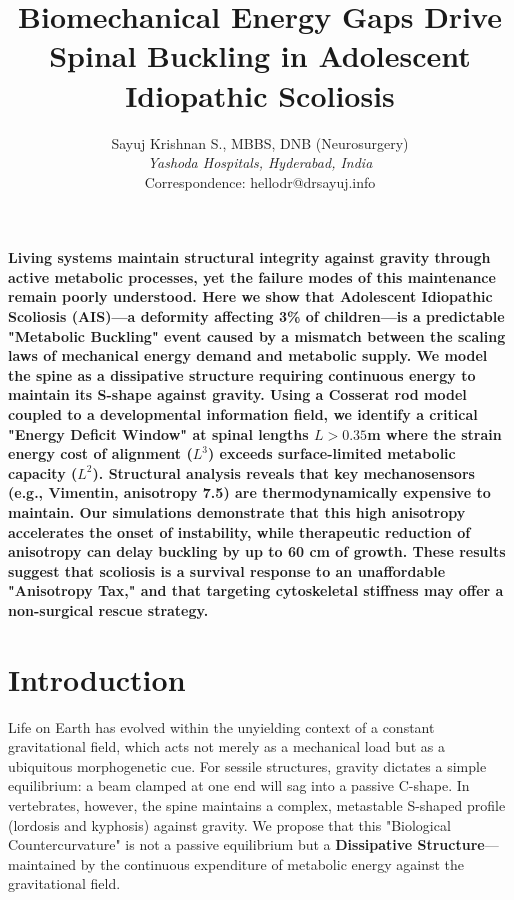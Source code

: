 \documentclass[11pt]{article}
\title{Biomechanical Energy Gaps Drive Spinal Buckling in Adolescent Idiopathic Scoliosis}
\author{Sayuj Krishnan S., MBBS, DNB (Neurosurgery) \\
\textit{Yashoda Hospitals, Hyderabad, India} \\
Correspondence: hellodr@drsayuj.info}
\date{}
\begin{document}
\maketitle

\textbf{Living systems maintain structural integrity against gravity through active metabolic processes, yet the failure modes of this maintenance remain poorly understood. Here we show that Adolescent Idiopathic Scoliosis (AIS)—a deformity affecting 3\% of children—is a predictable "Metabolic Buckling" event caused by a mismatch between the scaling laws of mechanical energy demand and metabolic supply. We model the spine as a dissipative structure requiring continuous energy to maintain its S-shape against gravity. Using a Cosserat rod model coupled to a developmental information field, we identify a critical "Energy Deficit Window" at spinal lengths $L > 0.35$m where the strain energy cost of alignment ($L^3$) exceeds surface-limited metabolic capacity ($L^2$). Structural analysis reveals that key mechanosensors (e.g., Vimentin, anisotropy 7.5) are thermodynamically expensive to maintain. Our simulations demonstrate that this high anisotropy accelerates the onset of instability, while therapeutic reduction of anisotropy can delay buckling by up to 60 cm of growth. These results suggest that scoliosis is a survival response to an unaffordable "Anisotropy Tax," and that targeting cytoskeletal stiffness may offer a non-surgical rescue strategy.}

\section*{Introduction}

Life on Earth has evolved within the unyielding context of a constant gravitational field, which acts not merely as a mechanical load but as a ubiquitous morphogenetic cue\cite{thompson1917growth}. For sessile structures, gravity dictates a simple equilibrium: a beam clamped at one end will sag into a passive C-shape. In vertebrates, however, the spine maintains a complex, metastable S-shaped profile (lordosis and kyphosis) against gravity\cite{latimer2005upright}. We propose that this "Biological Countercurvature" is not a passive equilibrium but a \textbf{Dissipative Structure}—maintained by the continuous expenditure of metabolic energy against the gravitational field.
\end{document}
